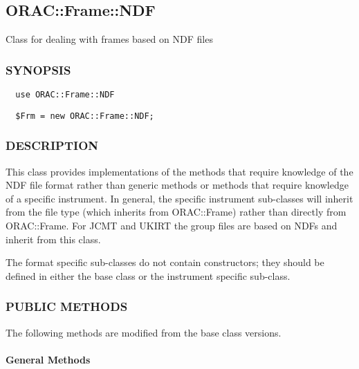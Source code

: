 \begin{description}
\begin{description}
\subsection{ORAC::Frame::NDF\label{ORAC::Frame::NDF}}


Class for dealing with frames based on NDF files

\subsubsection*{SYNOPSIS\label{ORAC::Frame::NDF_SYNOPSIS}}
\begin{verbatim}
  use ORAC::Frame::NDF
\end{verbatim}
\begin{verbatim}
  $Frm = new ORAC::Frame::NDF;
\end{verbatim}
\subsubsection*{DESCRIPTION\label{ORAC::Frame::NDF_DESCRIPTION}}


This class provides implementations of the methods that require
knowledge of the NDF file format rather than generic methods or
methods that require knowledge of a specific instrument.  In general,
the specific instrument sub-classes will inherit from the file type
(which inherits from ORAC::Frame) rather than directly from
ORAC::Frame. For JCMT and UKIRT the group files are based on NDFs and
inherit from this class.



The format specific sub-classes do not contain constructors; they 
should be defined in either the base class or the instrument specific
sub-class.

\subsubsection*{PUBLIC METHODS\label{ORAC::Frame::NDF_PUBLIC_METHODS}}


The following methods are modified from the base class versions.

\paragraph*{General Methods\label{ORAC::Frame::NDF_General_Methods}}
\begin{description}


\end{description}
\end{description}
\end{description}
